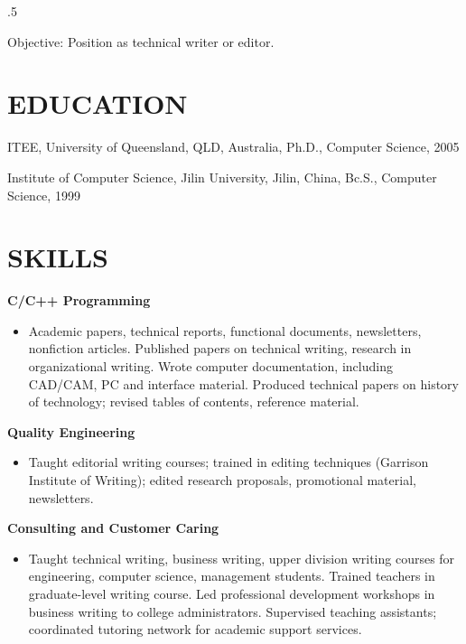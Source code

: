 \documentclass{res}
\begin{document}
 
\thispagestyle{empty} %
\address{120 Chester Road\\
Eight Mile Plains\\
0434130283}


\begin{resume}
\vspace{0.1in}
\moveleft.5\sectionwidth\centerline{Objective: Position as technical writer or editor.}  

\section{EDUCATION}
\vspace{0.1in} 
 
    ITEE, University of Queensland, QLD, Australia, Ph.D.,
    Computer Science, 2005
    
    Institute of Computer Science, Jilin University, Jilin, China, Bc.S.,
    Computer Science, 1999
 
\section{SKILLS} 
\vspace{0.1in}
  {\bf C/C++ Programming}
    \begin{itemize} %
      \item[] Academic papers, technical reports, functional documents, 
        newsletters, nonfiction articles. Published papers on 
        technical writing, research in organizational writing. 
        Wrote computer documentation, including CAD/CAM, PC and 
        interface material. Produced technical papers on history 
        of technology; revised tables of contents, reference 
        material. 
      \end{itemize}
  {\bf Quality Engineering} 
       \begin{itemize}
        \item[] Taught editorial writing courses; trained in editing 
        techniques (Garrison Institute of Writing); edited 
        research proposals, promotional material, newsletters.
    \end{itemize}

  {\bf Consulting and Customer Caring} 
        \begin{itemize}
        \item[] Taught technical writing, business writing, upper 
        division writing courses for engineering, computer 
        science, management students. Trained teachers in 
        graduate-level writing course. Led professional 
        development workshops in business writing to college 
        administrators. Supervised teaching assistants; 
        coordinated tutoring network for academic support 
        services. 
       \end{itemize}


\end{resume}
\end{document}
